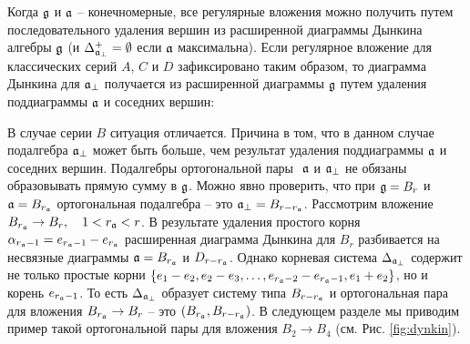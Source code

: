 Когда  $\mathfrak{g}$ и $\mathfrak{a}$ -- конечномерные, все регулярные вложения можно получить путем последовательного удаления вершин из расширенной диаграммы Дынкина алгебры $\mathfrak{g}$ (и  $\Delta_{\mathfrak{a}_{\perp} }^{+}=\emptyset $ если $\mathfrak{a}$ максимальна). Если регулярное вложение для классических серий $A$, $C$ и $D$ зафиксировано таким образом, то диаграмма Дынкина для $\mathfrak{a}_{\perp}$ получается из расширенной диаграммы $\mathfrak{g}$ путем удаления поддиаграммы $\mathfrak{a}$ и соседних вершин:
\begin{table}[tbh]
\label{tab:diagrams} \noindent {}
\caption{Подалгебры $\af,\;\afb$ для классических серий}
\end{table}

В случае серии $B$ ситуация отличается. Причина в том, что в данном случае подалгебра $\mathfrak{a}_{\perp}$ может быть больше, чем результат удаления поддиаграммы  $\mathfrak{a}$ и соседних вершин. Подалгебры ортогональной пары $\ \af$ и $\mathfrak{a}_{\perp}$ не обязаны образовывать прямую сумму в $\mathfrak{g}$. Можно явно проверить, что при  $\mathfrak{g}=B_{r}$ и $\mathfrak{a}=B_{r_{\mathfrak{a}}}$ ортогональная подалгебра -- это $\mathfrak{a}_{\perp}=B_{r-r_{\mathfrak{a}}}$. Рассмотрим вложение $B_{r_{\mathfrak{a}}}\rightarrow B_{r},\quad 1<r_{\mathfrak{a}}<r$. В результате удаления простого корня  $\alpha _{r_{\mathfrak{a}}-1}=e_{r_{\mathfrak{a}}-1}-e_{r_{\mathfrak{a}}}$ расширенная диаграмма Дынкина для $B_{r}$ разбивается на несвязные диаграммы $\mathfrak{a}=B_{r_{\mathfrak{a}}}$ и $D_{r-r_{\mathfrak{a}}}$. Однако корневая система  $\Delta _{\mathfrak{a}_{\perp}}$ содержит не только простые корни  $\left\{ e_{1}-e_{2},e_{2}-e_{3},\ldots ,e_{r_{\mathfrak{a}}-2}-e_{r_{\mathfrak{a}}-1},e_{1}+e_{2}\right\} $, но и корень $e_{r_{\mathfrak{a}}-1}$. То есть  $\Delta _{\mathfrak{a}_{\perp}}$ образует систему типа  $B_{r-r_{\mathfrak{a}}}$ и ортогональная пара для вложения $B_{r_{\mathfrak{a}}}\rightarrow B_{r}$ -- это  $\left( B_{r_{\mathfrak{a}}},B_{r-r_{\mathfrak{a}}}\right) $. В следующем разделе мы приводим пример такой ортогональной пары для вложения $B_{2}\rightarrow B_{4}$ (см. Рис. \ref{fig:dynkin}).

